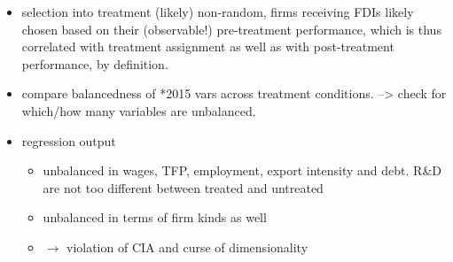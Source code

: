 \documentclass[11pt,a4paper,leqno]{article}
\begin{document}
\begin{itemize}
	\item selection into treatment (likely) non-random, firms receiving FDIs likely chosen based on their (observable!) pre-treatment performance, which is thus correlated with treatment assignment as well as with post-treatment performance, by definition. 
	\item compare balancedness of *2015 vars across treatment conditions.  --> check for which/how many variables are unbalanced.
	\item regression output
	\begin{itemize}
		\item unbalanced in wages, TFP, employment, export intensity and debt. R\&D are not too different between treated and untreated
		\item unbalanced in terms of firm kinds as well
		\item $\rightarrow$ violation of CIA and curse of dimensionality  
	\end{itemize}


\end{itemize}
\end{document}
